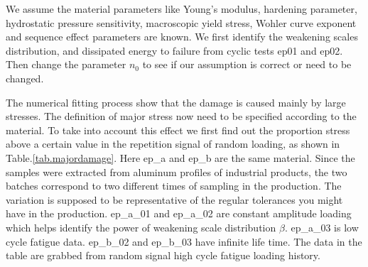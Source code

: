 \documentclass[3p,times,number,review]{elsarticle}
\begin{document}
We assume the material parameters like Young's modulus, hardening parameter, hydrostatic pressure sensitivity, macroscopic yield stress, Wohler curve exponent and sequence effect parameters are known. We first identify the weakening scales distribution, and dissipated energy to failure from cyclic tests ep01 and ep02. Then change the parameter $n_0$ to see if our assumption is correct or need to be changed. 


The numerical fitting process show that the damage is caused mainly by large stresses. The definition of major stress now need to be specified according to the material. To take into account this effect we first find out the proportion stress above a certain value in the repetition signal of random loading, as shown in Table.\ref{tab.majordamage}.  Here ep\_a and ep\_b are the same material. Since the samples were extracted from aluminum profiles of industrial products,  the two batches correspond to two different times of sampling in the production. The variation is supposed to be representative of the regular tolerances you might have in the production. ep\_a\_01 and ep\_a\_02 are constant amplitude loading which helps identify the power of weakening scale distribution $\beta$. ep\_a\_03 is low cycle fatigue data.  ep\_b\_02 and ep\_b\_03 have infinite life time. The data in the table are grabbed from random signal high cycle fatigue loading history.
\end{document}
